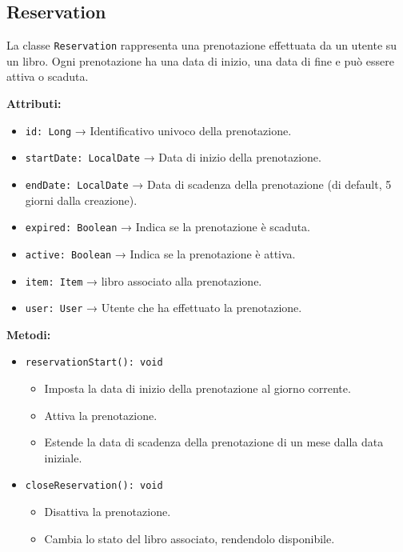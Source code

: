 \documentclass[twoside,openright,titlepage,fleqn,headinclude,12pt,a4paper,BCOR=5mm,footinclude]{scrbook}
\begin{document}
\subsection{Reservation}
La classe \texttt{Reservation} rappresenta una prenotazione effettuata da un utente su un libro. Ogni prenotazione ha una data di inizio, una data di fine e può essere attiva o scaduta.

\textbf{Attributi:}  
\begin{itemize}  
    \item \texttt{id: Long} → Identificativo univoco della prenotazione.  
    \item \texttt{startDate: LocalDate} → Data di inizio della prenotazione.  
    \item \texttt{endDate: LocalDate} → Data di scadenza della prenotazione (di default, 5 giorni dalla creazione).  
    \item \texttt{expired: Boolean} → Indica se la prenotazione è scaduta.  
    \item \texttt{active: Boolean} → Indica se la prenotazione è attiva.  
    \item \texttt{item: Item} → libro associato alla prenotazione.  
    \item \texttt{user: User} → Utente che ha effettuato la prenotazione.  
\end{itemize}  

\textbf{Metodi:}  
\begin{itemize}  
    \item \texttt{reservationStart(): void}  
    \begin{itemize}  
        \item Imposta la data di inizio della prenotazione al giorno corrente.  
        \item Attiva la prenotazione.  
        \item Estende la data di scadenza della prenotazione di un mese dalla data iniziale.  
    \end{itemize}  

    \item \texttt{closeReservation(): void}  
    \begin{itemize}  
        \item Disattiva la prenotazione.  
        \item Cambia lo stato del libro associato, rendendolo disponibile.  
    \end{itemize}  
\end{itemize}
\end{document}
